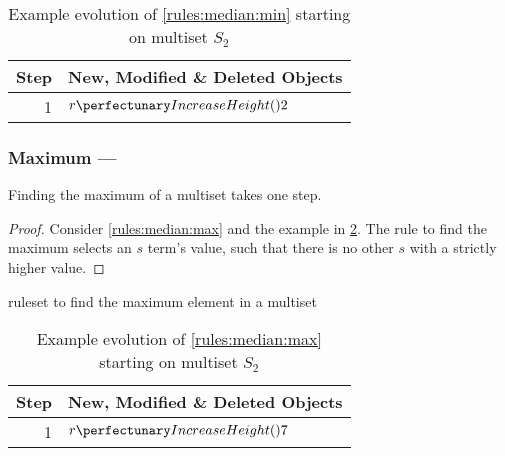 \begin{table}[htbp]
\centering
\begin{tabular}{|r|l|}
    \hline
    \textbf{Step} & \textbf{New, Modified \& Deleted Objects} \\ \hline
    1 & \(\cpfunc{r}{2}\) \\ \hline
\end{tabular}
\caption[Example evolution of \cref{rules:median:min} to find the minimum element in a multiset]{\label{tab:median:min}Example evolution of \cref{rules:median:min} starting on multiset \(S_2\)}
\end{table}

\subsubsection{\label{sec:median:max}Maximum --- }

\begin{proposition}\label{prop:median:max}
Finding the maximum of a multiset takes one step.
\end{proposition}

\begin{proof}
Consider \cref{rules:median:max} and the example in \cref{tab:median:max}.  The rule to find the maximum selects an \(s\) term's value, such that there is no other \(s\) with a strictly higher value.
\end{proof}

\begin{cprulesetfloat}
\begin{cpruleset}


\end{cpruleset}
\caption{\label{rules:median:max}\Gls{ruleset} to find the maximum element in a multiset}
\end{cprulesetfloat}

\begin{table}[htbp]
\centering
\begin{tabular}{|r|l|}
    \hline
    \textbf{Step} & \textbf{New, Modified \& Deleted Objects} \\ \hline
    1 & \(\cpfunc{r}{7}\)\\ \hline
\end{tabular} 
\caption[Example evolution of \cref{rules:median:max} to find the maximum element in a multiset]{\label{tab:median:max}Example evolution of \cref{rules:median:max} starting on multiset \(S_2\)}
\end{table}

